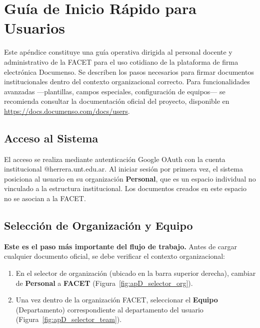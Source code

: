 \chapter{Guía de Inicio Rápido para Usuarios}
\label{AppendixD}

Este apéndice constituye una guía operativa dirigida al personal docente y administrativo de la FACET para el uso cotidiano de la plataforma de firma electrónica Documenso. Se describen los pasos necesarios para firmar documentos institucionales dentro del contexto organizacional correcto. Para funcionalidades avanzadas ---plantillas, campos especiales, configuración de equipos--- se recomienda consultar la documentación oficial del proyecto, disponible en \url{https://docs.documenso.com/docs/users}.


\section{Acceso al Sistema}
\label{AppendixD:Acceso}

El acceso se realiza mediante autenticación Google OAuth con la cuenta institucional @herrera.unt.edu.ar. Al iniciar sesión por primera vez, el sistema posiciona al usuario en su organización \textbf{Personal}, que es un espacio individual no vinculado a la estructura institucional. Los documentos creados en este espacio no se asocian a la FACET.


\section{Selección de Organización y Equipo}
\label{AppendixD:OrgTeam}

\textbf{Este es el paso más importante del flujo de trabajo.} Antes de cargar cualquier documento oficial, se debe verificar el contexto organizacional:

\begin{enumerate}[nosep]
    \item En el selector de organización (ubicado en la barra superior derecha), cambiar de \textbf{Personal} a \textbf{FACET} (Figura~\ref{fig:apD_selector_org}).
    \item Una vez dentro de la organización FACET, seleccionar el \textbf{Equipo} (Departamento) correspondiente al departamento del usuario (Figura~\ref{fig:apD_selector_team}).
\end{enumerate}


